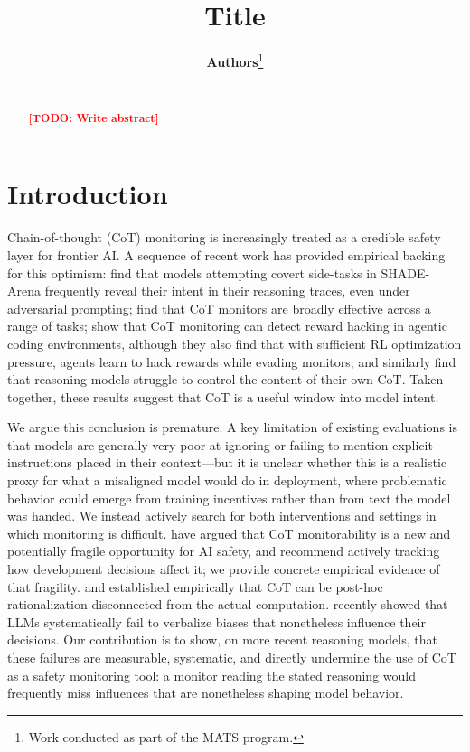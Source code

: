 \documentclass{article}
\title{Title}
\author{%
  \textbf{Authors}\thanks{Work conducted as part of the MATS program.} \\
  \texttt{\todo{email}} \\
}
\newcommand{\todo}[1]{\textbf{\textcolor{red}{[TODO: #1]}}}
\begin{document}
\maketitle

\begin{abstract}
\todo{Write abstract}
\end{abstract}

\section{Introduction}
\label{sec:intro}

Chain-of-thought (CoT) monitoring is increasingly treated as a credible safety layer for frontier AI. A sequence of recent work has provided empirical backing for this optimism: \citet{zolkowski2025obfuscate} find that models attempting covert side-tasks in SHADE-Arena frequently reveal their intent in their reasoning traces, even under adversarial prompting; \citet{guan2025monitoring} find that CoT monitors are broadly effective across a range of tasks; \citet{baker2025monitoring} show that CoT monitoring can detect reward hacking in agentic coding environments, although they also find that with sufficient RL optimization pressure, agents learn to hack rewards while evading monitors; and \citet{chen2026controllability} similarly find that reasoning models struggle to control the content of their own CoT. Taken together, these results suggest that CoT is a useful window into model intent.

We argue this conclusion is premature. A key limitation of existing evaluations is that models are generally very poor at ignoring or failing to mention explicit instructions placed in their context---but it is unclear whether this is a realistic proxy for what a misaligned model would do in deployment, where problematic behavior could emerge from training incentives rather than from text the model was handed. We instead actively search for both interventions and settings in which monitoring is difficult. \citet{korbak2025fragile} have argued that CoT monitorability is a new and potentially fragile opportunity for AI safety, and recommend actively tracking how development decisions affect it; we provide concrete empirical evidence of that fragility. \citet{turpin2023language} and \citet{lanham2023measuring} established empirically that CoT can be post-hoc rationalization disconnected from the actual computation. \citet{arcuschin2026biases} recently showed that LLMs systematically fail to verbalize biases that nonetheless influence their decisions. Our contribution is to show, on more recent reasoning models, that these failures are measurable, systematic, and directly undermine the use of CoT as a safety monitoring tool: a monitor reading the stated reasoning would frequently miss influences that are nonetheless shaping model behavior.
\end{document}
